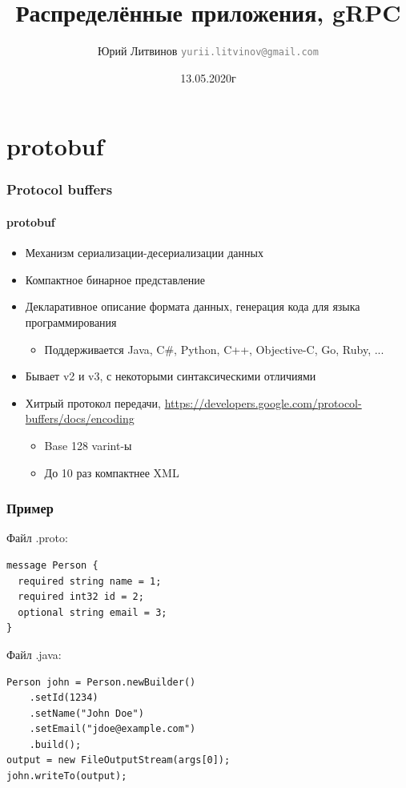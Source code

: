 \documentclass[xetex,mathserif,serif]{beamer}
\title{Распределённые приложения, gRPC}
\author[Юрий Литвинов]{Юрий Литвинов \newline \textcolor{gray}{\small\texttt{yurii.litvinov@gmail.com}}}
\date{13.05.2020г}
\begin{document}
    
    \frame{\titlepage}

    \section{protobuf}

    \begin{frame}
        \frametitle{Protocol buffers}
        \framesubtitle{protobuf}
        \begin{itemize}
            \item Механизм сериализации-десериализации данных
            \item Компактное бинарное представление
            \item Декларативное описание формата данных, генерация кода для языка программирования
            \begin{itemize}
                \item Поддерживается Java, C\#, Python, C++, Objective-C, Go, Ruby, ...
            \end{itemize}
            \item Бывает v2 и v3, с некоторыми синтаксическими отличиями
            \item Хитрый протокол передачи, \url{https://developers.google.com/protocol-buffers/docs/encoding}
            \begin{itemize}
                \item Base 128 varint-ы
                \item До 10 раз компактнее XML 
            \end{itemize}
        \end{itemize}
    \end{frame}

    \begin{frame}[fragile]
        \frametitle{Пример}
        Файл .proto:
        \begin{verbatim}
message Person {
  required string name = 1;
  required int32 id = 2;
  optional string email = 3;
}
        \end{verbatim}
        Файл .java:
        \begin{verbatim}
Person john = Person.newBuilder()
    .setId(1234)
    .setName("John Doe")
    .setEmail("jdoe@example.com")
    .build();
output = new FileOutputStream(args[0]);
john.writeTo(output);
        \end{verbatim}
    \end{frame}
\end{document}
